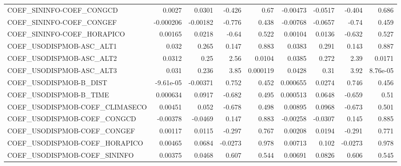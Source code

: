 \begin{tabular}{lrrrrrrrr}
COEF\_SININFO-COEF\_CONGCD       &      0.0027 &       0.0301 &  -0.426 &     0.67 &   -0.00473 &     -0.0517 &       -0.404 &         0.686 \\
COEF\_SININFO-COEF\_CONGEF       &   -0.000206 &     -0.00182 &  -0.776 &    0.438 &   -0.00768 &     -0.0657 &        -0.74 &         0.459 \\
COEF\_SININFO-COEF\_HORAPICO     &     0.00165 &       0.0218 &   -0.64 &    0.522 &    0.00104 &      0.0136 &       -0.632 &         0.527 \\
COEF\_USODISPMOB-ASC\_ALT1       &       0.032 &        0.265 &   0.147 &    0.883 &     0.0383 &       0.291 &        0.143 &         0.887 \\
COEF\_USODISPMOB-ASC\_ALT2       &      0.0312 &         0.25 &    2.56 &   0.0104 &     0.0385 &       0.272 &         2.39 &        0.0171 \\
COEF\_USODISPMOB-ASC\_ALT3       &       0.031 &        0.236 &    3.85 & 0.000119 &     0.0428 &        0.31 &         3.92 &      8.76e-05 \\
COEF\_USODISPMOB-B\_DIST         &   -9.61e-05 &     -0.00371 &   0.752 &    0.452 &   0.000655 &      0.0274 &        0.746 &         0.456 \\
COEF\_USODISPMOB-B\_TIME         &    0.000634 &       0.0917 &  -0.682 &    0.495 &   0.000513 &      0.0648 &       -0.659 &          0.51 \\
COEF\_USODISPMOB-COEF\_CLIMASECO &     0.00451 &        0.052 &  -0.678 &    0.498 &    0.00895 &      0.0968 &       -0.673 &         0.501 \\
COEF\_USODISPMOB-COEF\_CONGCD    &    -0.00378 &      -0.0469 &   0.147 &    0.883 &   -0.00258 &     -0.0307 &        0.145 &         0.885 \\
COEF\_USODISPMOB-COEF\_CONGEF    &     0.00117 &       0.0115 &  -0.297 &    0.767 &    0.00208 &      0.0194 &       -0.291 &         0.771 \\
COEF\_USODISPMOB-COEF\_HORAPICO  &     0.00465 &       0.0684 & -0.0273 &    0.978 &    0.00713 &       0.102 &      -0.0273 &         0.978 \\
COEF\_USODISPMOB-COEF\_SININFO   &     0.00375 &       0.0468 &   0.607 &    0.544 &    0.00691 &      0.0826 &        0.606 &         0.545 \\
\bottomrule
\end{tabular}
